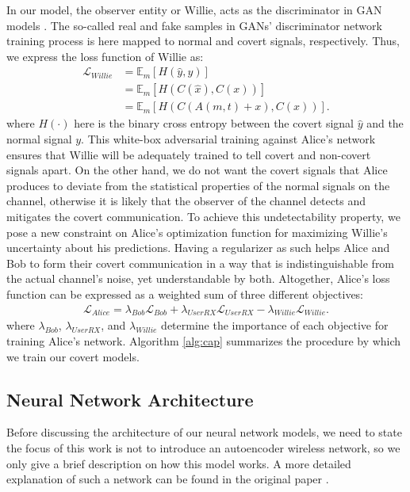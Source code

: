 In our model, the observer entity or Willie, acts as the discriminator in GAN models \cite{goodfellow2014generative}. The so-called real and fake samples in GANs' discriminator network training process is here mapped to normal and covert signals, respectively. Thus, we express the loss function of Willie as:
\begin{equation}
	\begin{aligned} \label{willie_loss}
	\mathcal{L}_{Willie} & = \mathbb{E}_{m}[H(\hat{y}, y)] \\
	& = \mathbb{E}_{m}[H(C(\hat{x}), C(x))] \\
	& = \mathbb{E}_{m}[H(C(A(m,t) + x), C(x))].
	\end{aligned}
\end{equation}
where \(H(\cdot)\) here is the binary cross entropy between the covert signal \(\hat{y}\) and the normal signal \(y\). This white-box adversarial training against Alice's network ensures that Willie will be adequately trained to tell covert and non-covert signals apart. On the other hand, we do not want the covert signals that Alice produces to deviate from the statistical properties of the normal signals on the channel, otherwise it is likely that the observer of the channel detects and mitigates the covert communication. To achieve this undetectability property, we pose a new constraint on Alice's optimization function for maximizing Willie's uncertainty about his predictions. Having a regularizer as such helps Alice and Bob to form their covert communication in a way that is indistinguishable from the actual channel's noise, yet understandable by both. Altogether, Alice's loss function can be expressed as a weighted sum of three different objectives:
\begin{equation}
	\begin{array}{l} \label{alice_loss}
	\mathcal{L}_{Alice} = \lambda_{Bob} \mathcal{L}_{Bob} + \lambda_{UserRX} \mathcal{L}_{UserRX} - \lambda_{Willie} \mathcal{L}_{Willie}.
\end{array}
\end{equation}
where \(\lambda_{Bob}\), \(\lambda_{UserRX}\), and \(\lambda_{Willie}\) determine the importance of each objective for training Alice's network. Algorithm \ref{alg:cap} summarizes the procedure by which we train our covert models.

\subsection{Neural Network Architecture}
Before discussing the architecture of our neural network models, we need to state the focus of this work is not to introduce an autoencoder wireless network, so we only give a brief description on how this model works. A more detailed explanation of such a network can be found in the original paper \cite{o2017introduction}.


